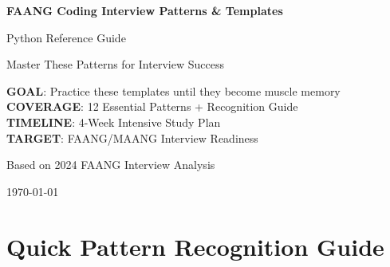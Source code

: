 \documentclass[10pt,a4paper]{article}
\begin{document}
\begin{titlepage}
\centering
{\huge\bfseries FAANG Coding Interview Patterns \& Templates\par}
\vspace{1cm}
{\LARGE Python Reference Guide\par}
\vspace{1.5cm}
{\Large Master These Patterns for Interview Success\par}
\vspace{2cm}

\begin{tcolorbox}[colback=blue!10,colframe=blue!50!black,width=0.8\textwidth]
\centering
\textbf{GOAL}: Practice these templates until they become muscle memory\\
\textbf{COVERAGE}: 12 Essential Patterns + Recognition Guide\\
\textbf{TIMELINE}: 4-Week Intensive Study Plan\\
\textbf{TARGET}: FAANG/MAANG Interview Readiness
\end{tcolorbox}

\vspace{2cm}
{\large Based on 2024 FAANG Interview Analysis\par}
\vfill
{\large \today\par}
\end{titlepage}

\tableofcontents
\newpage

\section{Quick Pattern Recognition Guide}
\end{document}
